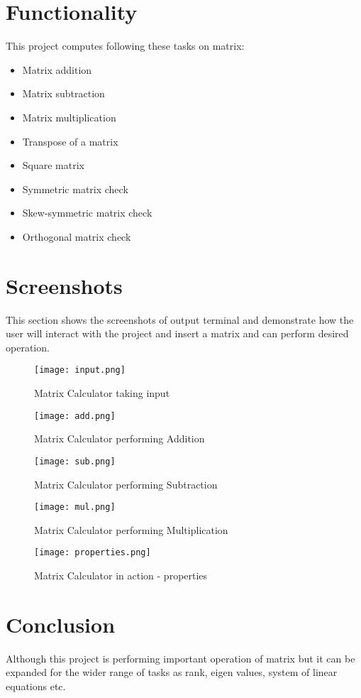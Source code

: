 \documentclass{article}
\begin{document}
\section{Functionality}
This project computes following these tasks on matrix: 
\begin{itemize}
    \item Matrix addition
    \item Matrix subtraction
    \item Matrix multiplication
    \item Transpose of a matrix
    \item Square matrix 
    \item Symmetric matrix check
    \item Skew-symmetric matrix check
    \item Orthogonal matrix check
\end{itemize}

\section{Screenshots}
This section shows the screenshots of output terminal and demonstrate how the user will interact with the project and insert a matrix and can perform desired operation.


\begin{figure}
    \centering
    \texttt{[image: input.png]}
    \caption{Matrix Calculator taking input}
\end{figure}




\begin{figure}
    \centering
    \texttt{[image: add.png]}
    \caption{Matrix Calculator performing Addition}
\end{figure}



\begin{figure}
    \centering
    \texttt{[image: sub.png]}
    \caption{Matrix Calculator performing Subtraction}
\end{figure}



\begin{figure}
    \centering
    \texttt{[image: mul.png]}
    \caption{Matrix Calculator performing Multiplication}
\end{figure}

\begin{figure}
    \centering
    \texttt{[image: properties.png]}
    \caption{Matrix Calculator in action - properties}
\end{figure}

\section{Conclusion}
Although this project is performing important operation of matrix but it can be expanded for the wider range of tasks as rank, eigen values, system of linear equations etc. 
\end{document}
